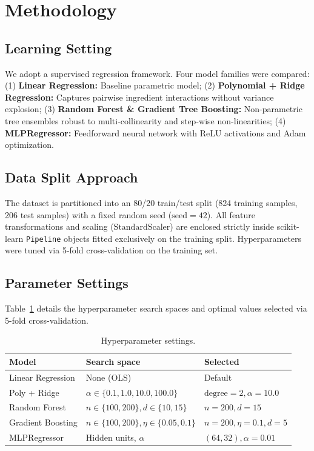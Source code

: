 \documentclass[conference]{IEEEtran}
\begin{document}
\section{Methodology}
\subsection{Learning Setting}
We adopt a supervised regression framework. Four model families were compared:
(1) \textbf{Linear Regression:} Baseline parametric model;
(2) \textbf{Polynomial + Ridge Regression:} Captures pairwise ingredient interactions without variance explosion;
(3) \textbf{Random Forest \& Gradient Tree Boosting:} Non-parametric tree ensembles robust to multi-collinearity and step-wise non-linearities;
(4) \textbf{MLPRegressor:} Feedforward neural network with ReLU activations and Adam optimization.

\subsection{Data Split Approach}
The dataset is partitioned into an 80/20 train/test split (824 training samples, 206 test samples) with a fixed random seed ($\text{seed} = 42$). All feature transformations and scaling ($\text{StandardScaler}$) are enclosed strictly inside scikit-learn \texttt{Pipeline} objects fitted exclusively on the training split. Hyperparameters were tuned via 5-fold cross-validation on the training set.

\subsection{Parameter Settings}
Table~\ref{tab:hyperparams} details the hyperparameter search spaces and optimal values selected via 5-fold cross-validation.

\begin{table}[htbp]
\caption{Hyperparameter settings.}
\label{tab:hyperparams}
\centering
\begin{tabular}{lll}
\toprule
\textbf{Model} & \textbf{Search space} & \textbf{Selected} \\
\midrule
Linear Regression & None (OLS) & Default \\
Poly + Ridge & $\alpha \in \{0.1, 1.0, 10.0, 100.0\}$ & $\text{degree}=2, \alpha=10.0$ \\
Random Forest & $n \in \{100, 200\}, d \in \{10, 15\}$ & $n=200, d=15$ \\
Gradient Boosting & $n \in \{100, 200\}, \eta \in \{0.05, 0.1\}$ & $n=200, \eta=0.1, d=5$ \\
MLPRegressor & Hidden units, $\alpha$ & $(64, 32), \alpha=0.01$ \\
\bottomrule
\end{tabular}
\end{table}
\end{document}
